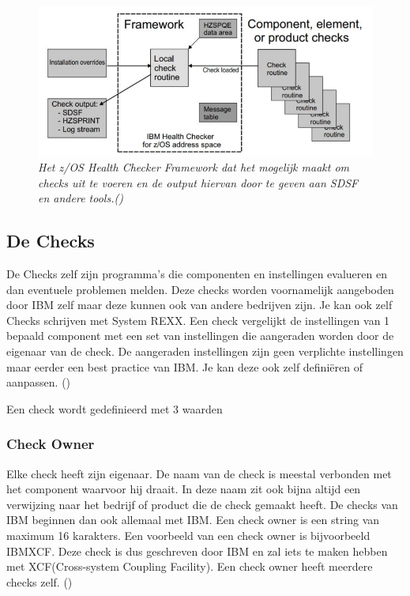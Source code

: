 \begin{figure}[h]
	\centering
	\includegraphics[width=0.7\linewidth]{img/HCFramework}
	\caption[z/OS Health Checker Framework]{{\small \textit{Het z/OS Health Checker Framework dat het mogelijk maakt om checks uit te voeren en de output hiervan door te geven aan SDSF en andere tools.(\cite{IBMCorporation2019})}}}
	\label{fig:hcframework}
\end{figure}


\subsection{De Checks}
\label{sec:z/OS Health Checker Checks}

De Checks zelf zijn programma's die componenten en instellingen evalueren en dan eventuele problemen melden. Deze checks worden voornamelijk aangeboden door IBM zelf maar deze kunnen ook van andere bedrijven zijn. Je kan ook zelf Checks schrijven met System REXX. Een check vergelijkt de instellingen van 1 bepaald component met een set van instellingen die aangeraden worden door de eigenaar van de check. De aangeraden instellingen zijn geen verplichte instellingen maar eerder een best practice van IBM. Je kan deze ook zelf definiëren of aanpassen. (\cite{Bezzi2010})

Een check wordt gedefinieerd met 3 waarden

\subsubsection{Check Owner}
\label{subsubsec:Check Owner}

Elke check heeft zijn eigenaar. De naam van de check is meestal verbonden met het component waarvoor hij draait. In deze naam zit ook bijna altijd een verwijzing naar het bedrijf of product die de check gemaakt heeft. De checks van IBM beginnen dan ook allemaal met IBM. Een check owner is een string van maximum 16 karakters. Een voorbeeld van een check owner is bijvoorbeeld IBMXCF. Deze check is dus geschreven door IBM en zal iets te maken hebben met XCF(Cross-system Coupling Facility). Een check owner heeft meerdere checks zelf. (\cite{Bezzi2010})

